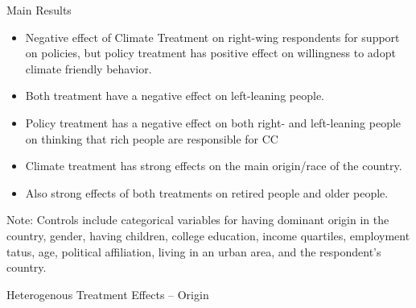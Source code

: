 \begin{frame}{Main Results}
\begin{itemize}
	\item Negative effect of Climate Treatment on right-wing respondents for support on policies, but policy treatment has positive effect on willingness to adopt climate friendly behavior.
	\item Both treatment have a negative effect on left-leaning people.
	\item Policy treatment has a negative effect on both right- and left-leaning people on thinking that rich people are responsible for CC \newline %
	\item Climate treatment has strong effects on the main origin/race of the country. \newline
	\item Also strong effects of both treatments on retired people and older people.
\end{itemize}
\end{frame}


\begin{frame}{}%
\begin{table}[h!]
\begin{center}
\scalebox{.46}{}
\end{center}
	{\fontsize{4}{6}\selectfont Note: Controls include categorical variables for having dominant origin in the country, gender, having children, college education,
income quartiles, employment tatus, age, political affiliation, living in an urban area, and the respondent's country.}
\end{table}
\end{frame}

\begin{frame}{}%
\begin{table}[h!]
\caption{Heterogenous Treatment Effects -- Origin}
\begin{center}
\scalebox{.44}{}
\end{center}
\end{table}
\end{frame}

